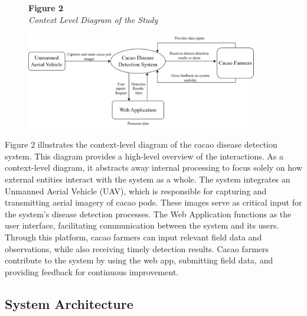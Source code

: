 	\begin{figure}[H]
		\raggedright
		\textbf{Figure 2} \\ %
		\textit{Context Level Diagram of the Study} %
		
		\vspace{0.5em}
		\centering
		\includegraphics[width=0.9\textwidth]{figures/Context-Level.pdf} %
		
		\vspace{0.5em}
		\raggedright
		
		\label{fig:context-level}
	\end{figure}
	
	Figure 2 illustrates the context-level diagram of the cacao disease detection system. This diagram provides a high-level overview of the interactions. As a context-level diagram, it abstracts away internal processing to focus solely on how external entities interact with the system as a whole. The system integrates an Unmanned Aerial Vehicle (UAV), which is responsible for capturing and transmitting aerial imagery of cacao pods. These images serve as critical input for the system’s disease detection processes. The Web Application functions as the user interface, facilitating communication between the system and its users. Through this platform, cacao farmers can input relevant field data and observations, while also receiving timely detection results. Cacao farmers contribute to the system by using the web app, submitting field data, and providing feedback for continuous improvement.
	
	\subsection{System Architecture}
	
